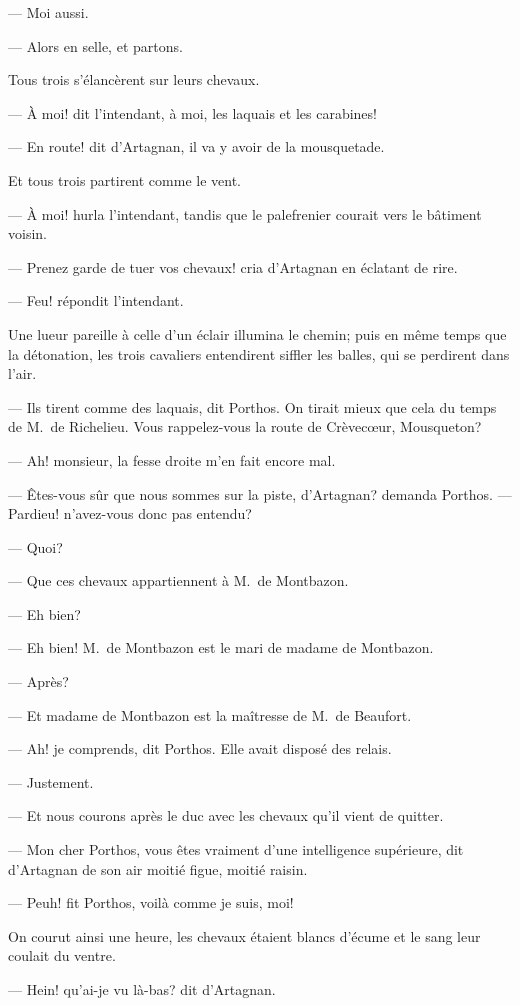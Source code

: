 — Moi aussi.

— Alors en selle, et partons.

Tous trois s'élancèrent sur leurs chevaux.

— À moi! dit l'intendant, à moi, les laquais et les carabines!

— En route! dit d'Artagnan, il va y avoir de la mousquetade.

Et tous trois partirent comme le vent.

— À moi! hurla l'intendant, tandis que le palefrenier courait vers le bâtiment voisin.

— Prenez garde de tuer vos chevaux! cria d'Artagnan en éclatant de rire.

— Feu! répondit l'intendant.

Une lueur pareille à celle d'un éclair illumina le chemin; puis en même temps que la détonation, les trois cavaliers entendirent siffler les balles, qui se perdirent dans l'air.

— Ils tirent comme des laquais, dit Porthos. On tirait mieux que cela du temps de M.~de Richelieu. Vous rappelez-vous la route de Crèvecœur, Mousqueton?

— Ah! monsieur, la fesse droite m'en fait encore mal.

— Êtes-vous sûr que nous sommes sur la piste, d'Artagnan? demanda Porthos.
— Pardieu! n'avez-vous donc pas entendu?

— Quoi?

— Que ces chevaux appartiennent à M.~de Montbazon.

— Eh bien?

— Eh bien! M.~de Montbazon est le mari de madame de Montbazon.

— Après?

— Et madame de Montbazon est la maîtresse de M.~de Beaufort.

— Ah! je comprends, dit Porthos. Elle avait disposé des relais.

— Justement.

— Et nous courons après le duc avec les chevaux qu'il vient de quitter.

— Mon cher Porthos, vous êtes vraiment d'une intelligence supérieure, dit d'Artagnan de son air moitié figue, moitié raisin.

— Peuh! fit Porthos, voilà comme je suis, moi!

On courut ainsi une heure, les chevaux étaient blancs d'écume et le sang leur coulait du ventre.

— Hein! qu'ai-je vu là-bas? dit d'Artagnan.

